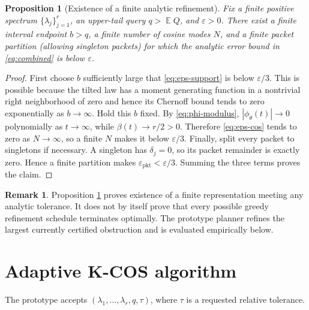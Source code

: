 \documentclass[11pt]{article}
\newtheorem{proposition}[theorem]{Proposition}
\theoremstyle{definition}
\newtheorem{remark}[theorem]{Remark}
\DeclareMathOperator{\E}{\mathbb E}
\newcommand{\eps}{\varepsilon}
\begin{document}
\begin{proposition}[Existence of a finite analytic refinement]
\label{prop:finite-refinement}
Fix a finite positive spectrum $\{\lambda_j\}_{j=1}^{r}$, an upper-tail query $q>\E Q$, and $\eps>0$. There exist a finite interval endpoint $b>q$, a finite number of cosine modes $N$, and a finite packet partition (allowing singleton packets) for which the analytic error bound in \eqref{eq:combined} is below $\eps$.
\end{proposition}

\begin{proof}
First choose $b$ sufficiently large that \eqref{eq:eps-support} is below $\eps/3$. This is possible because the tilted law has a moment generating function in a nontrivial right neighborhood of zero and hence its Chernoff bound tends to zero exponentially as $b\to\infty$. Hold this $b$ fixed. By \eqref{eq:phi-modulus}, $|\phi_{\theta}(t)|\to0$ polynomially as $t\to\infty$, while $\beta(t)\to r/2>0$. Therefore \eqref{eq:eps-cos} tends to zero as $N\to\infty$, so a finite $N$ makes it below $\eps/3$. Finally, split every packet to singletons if necessary. A singleton has $\delta_j=0$, so its packet remainder is exactly zero. Hence a finite partition makes $\eps_{\mathrm{pkt}}<\eps/3$. Summing the three terms proves the claim.
\end{proof}

\begin{remark}
Proposition \ref{prop:finite-refinement} proves existence of a finite representation meeting any analytic tolerance. It does not by itself prove that every possible greedy refinement schedule terminates optimally. The prototype planner refines the largest currently certified obstruction and is evaluated empirically below.
\end{remark}

\section{Adaptive K-COS algorithm}

The prototype accepts $(\lambda_1,\ldots,\lambda_r,q,\tau)$, where $\tau$ is a requested relative tolerance.
\end{document}
